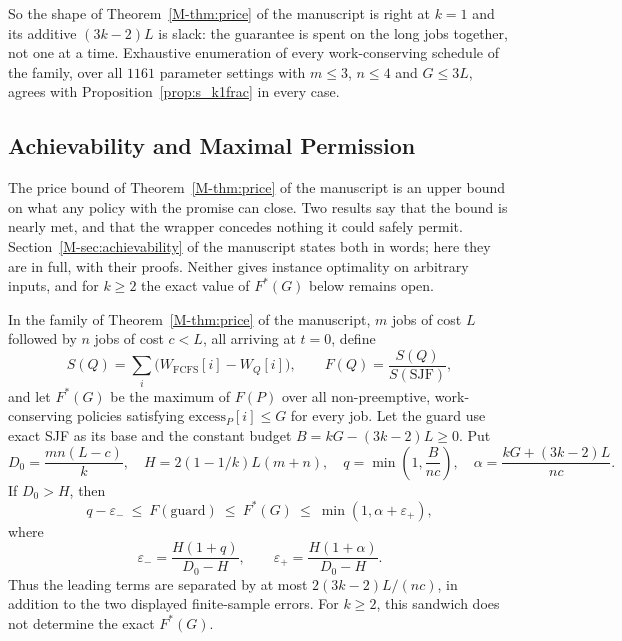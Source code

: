 \documentclass[mathematics,supfile,submit,moreauthors]{Definitions/mdpi}
\begin{document}
So the shape of Theorem~\ref*{M-thm:price} of the manuscript is right at $k = 1$ and its additive
$(3k-2)L$ is slack: the guarantee is spent on the long jobs together, not one at
a time. Exhaustive enumeration of every work-conserving schedule of the family,
over all $1161$ parameter settings with $m \le 3$, $n \le 4$ and
$G \le 3L$, agrees with Proposition~\ref{prop:s_k1frac} in every case.

\subsection{Achievability and Maximal Permission}
\label{sec:supp_achiev}

The price bound of Theorem~\ref*{M-thm:price} of the manuscript is an upper bound on what any policy
with the promise can close. Two results say that the bound is nearly met, and that the
wrapper concedes nothing it could safely permit. Section~\ref*{M-sec:achievability} of the manuscript states
both in words; here they are in full, with their proofs. Neither gives instance
optimality on arbitrary inputs, and for $k\geq2$ the exact value of $F^*(G)$ below
remains open.

\begin{proposition}
\label{thm:two_size_achievability}
In the family of Theorem~\ref*{M-thm:price} of the manuscript, $m$ jobs of cost $L$
followed by $n$ jobs of cost $c<L$, all arriving at $t=0$, define
\[
  S(Q)=\sum_i\bigl(W_{\mathrm{FCFS}}[i]-W_Q[i]\bigr),\qquad
  F(Q)=\frac{S(Q)}{S(\mathrm{SJF})},
\]
and let $F^*(G)$ be the maximum of $F(P)$ over all non-preemptive,
work-conserving policies satisfying $\mathrm{excess}_P[i]\leq G$ for every job.
Let the guard use exact SJF as its base and the constant budget
$B=kG-(3k-2)L\geq0$. Put
\[
 D_0=\frac{mn(L-c)}{k},\quad
 H=2(1-1/k)L(m+n),\quad
 q=\min\!\left(1,\frac{B}{nc}\right),\quad
 \alpha=\frac{kG+(3k-2)L}{nc}.
\]
If $D_0>H$, then
\[
 q-\varepsilon_-\ \leq\ F(\mathrm{guard})\ \leq\ F^*(G)
 \ \leq\ \min(1,\alpha+\varepsilon_+),
\]
where
\[
 \varepsilon_- = \frac{H(1+q)}{D_0-H},
 \qquad
 \varepsilon_+ = \frac{H(1+\alpha)}{D_0-H}.
\]
Thus the leading terms are separated by at most
$2(3k-2)L/(nc)$, in addition to the two displayed finite-sample
errors. For $k\geq2$, this sandwich does not determine the exact $F^*(G)$.
\end{proposition}
\end{document}

